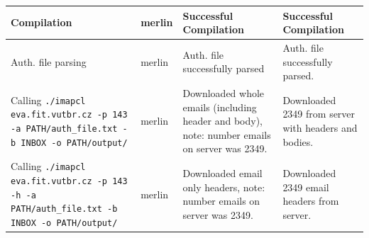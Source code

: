 \documentclass[a4paper,11pt]{article}
\begin{document}
\begin{center}
\begin{tabularx}{\textwidth}{|>{\raggedright\arraybackslash}p{5cm}|>{\raggedright\arraybackslash}p{1cm}|>{\raggedright\arraybackslash}p{5cm}|>{\raggedright\arraybackslash}X|}
        \hline
        Compilation & merlin & Successful Compilation & Successful Compilation \\
        \hline
        Auth. file parsing & merlin & Auth. file successfully parsed & Auth. file successfully parsed. \\
        \hline
        Calling \texttt{./imapcl eva.fit.vutbr.cz -p 143 -a PATH/auth\_file.txt -b INBOX -o PATH/output/} & merlin & Downloaded whole emails (including header and body), note: number emails on server was 2349. & Downloaded 2349 from server with headers and bodies. \\
        \hline
        Calling \texttt{./imapcl eva.fit.vutbr.cz -p 143 -h -a PATH/auth\_file.txt -b INBOX -o PATH/output/} & merlin & Downloaded email only headers, note: number emails on server was 2349. & Downloaded 2349 email headers from server. \\
        \hline
    \end{tabularx}
    \vspace{0.5cm} %
\end{center}
\end{document}
